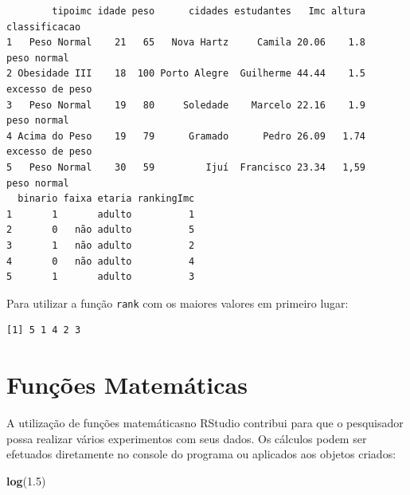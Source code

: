 \documentclass[12pt,portuguese,oneside]{book}
\newenvironment{Shaded}{\begin{snugshade}}{\end{snugshade}}
\newcommand{\KeywordTok}[1]{\textcolor[rgb]{0.13,0.29,0.53}{\textbf{#1}}}
\newcommand{\FloatTok}[1]{\textcolor[rgb]{0.00,0.00,0.81}{#1}}
\newcommand{\OperatorTok}[1]{\textcolor[rgb]{0.81,0.36,0.00}{\textbf{#1}}}
\newcommand{\NormalTok}[1]{#1}
\begin{document}
\begin{Shaded}
\end{Shaded}

\begin{verbatim}
        tipoimc idade peso      cidades estudantes   Imc altura   classificacao
1   Peso Normal    21   65   Nova Hartz     Camila 20.06    1.8     peso normal
2 Obesidade III    18  100 Porto Alegre  Guilherme 44.44    1.5 excesso de peso
3   Peso Normal    19   80     Soledade    Marcelo 22.16    1.9     peso normal
4 Acima do Peso    19   79      Gramado      Pedro 26.09   1.74 excesso de peso
5   Peso Normal    30   59         Ijuí  Francisco 23.34   1,59     peso normal
  binario faixa etaria rankingImc
1       1       adulto          1
2       0   não adulto          5
3       1   não adulto          2
4       0   não adulto          4
5       1       adulto          3
\end{verbatim}

Para utilizar a função \texttt{rank} com os maiores valores em primeiro
lugar:

\begin{Shaded}
\end{Shaded}

\begin{verbatim}
[1] 5 1 4 2 3
\end{verbatim}

\section{Funções Matemáticas}\label{funcoes-matematicas}

A utilização de funções matemáticasno RStudio contribui para que o
pesquisador possa realizar vários experimentos com seus dados. Os
cálculos podem ser efetuados diretamente no console do programa ou
aplicados aos objetos criados:

\begin{Shaded}
\begin{Highlighting}[]
\KeywordTok{log}\NormalTok{(}\FloatTok{1.5}\NormalTok{)}
\end{Highlighting}
\end{Shaded}
\end{document}
